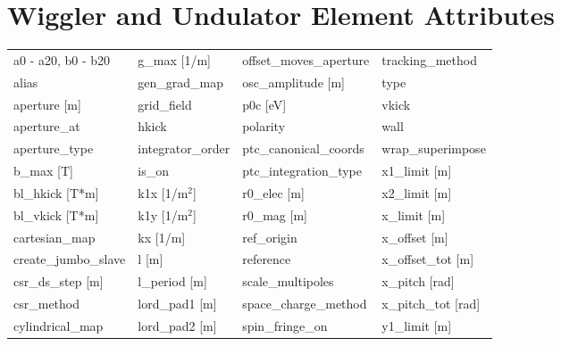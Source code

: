 \section{Wiggler and Undulator Element Attributes}
 \label{s:list.wiggler}
 
 \begin{tabular}{llll} \toprule
a0 - a20, b0 - b20               & g_max [1/m]                      & offset_moves_aperture            & tracking_method                  \\
alias                            & gen_grad_map                     & osc_amplitude [m]                & type                             \\
aperture [m]                     & grid_field                       & p0c [eV]                         & vkick                            \\
aperture_at                      & hkick                            & polarity                         & wall                             \\
aperture_type                    & integrator_order                 & ptc_canonical_coords             & wrap_superimpose                 \\
b_max [T]                        & is_on                            & ptc_integration_type             & x1_limit [m]                     \\
bl_hkick [T*m]                   & k1x [1/m$^2$]                    & r0_elec [m]                      & x2_limit [m]                     \\
bl_vkick [T*m]                   & k1y [1/m$^2$]                    & r0_mag [m]                       & x_limit [m]                      \\
cartesian_map                    & kx [1/m]                         & ref_origin                       & x_offset [m]                     \\
create_jumbo_slave               & l [m]                            & reference                        & x_offset_tot [m]                 \\
csr_ds_step [m]                  & l_period [m]                     & scale_multipoles                 & x_pitch [rad]                    \\
csr_method                       & lord_pad1 [m]                    & space_charge_method              & x_pitch_tot [rad]                \\
cylindrical_map                  & lord_pad2 [m]                    & spin_fringe_on                   & y1_limit [m]                     \\

\end{tabular}
